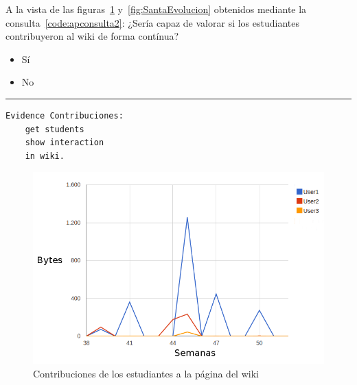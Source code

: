 \begin{mdframed}[style=cuestionarioST]

			A la vista de las figuras~\ref{fig:SantaContribuciones} y~\ref{fig:SantaEvolucion} obtenidos mediante la consulta~\ref{code:apconsulta2}: ¿Sería capaz de valorar si los estudiantes contribuyeron al wiki de forma contínua?
			\begin{itemize}
				\item Sí
				\item No
			\end{itemize}

			\rule{30mm}{1pt} \newline

\begin{lstlisting}[caption=Consulta participación de los estudiantes en el wiki,label=code:apconsulta2, captionpos=b, morekeywords={Evidence,get, students, show, milestones, participation, access, in, assignment, forum, campus, wiki, between, and, workshop, interaction, assessment, grade, from, course, backup}]
Evidence Contribuciones: 
	get students 
	show interaction 
	in wiki.
\end{lstlisting}
\end{mdframed}

\begin{figure}[h]
  \begin{center}
    \includegraphics[scale=0.5]{santa_contribuciones.png}
  \end{center}
  \caption{Contribuciones de los estudiantes a la página del wiki}
  \label{fig:SantaContribuciones}
\end{figure}

\newpage

